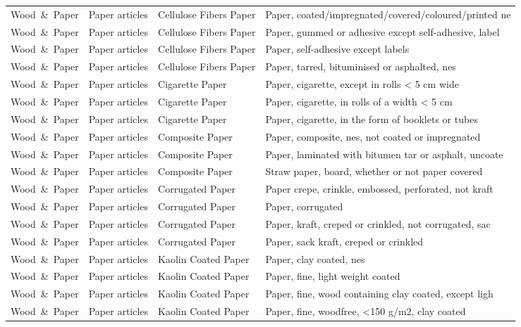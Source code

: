 \begin{appendices}
\begin{xltabular}{\textwidth}{|p{0.10\textwidth}|p{0.25\textwidth}|p{0.20\textwidth}|p{0.35\textwidth}|}
			Wood\ \&\ Paper & Paper articles & Cellulose Fibers Paper & Paper, coated/impregnated/covered/coloured/printed ne \\
			Wood\ \&\ Paper & Paper articles & Cellulose Fibers Paper & Paper, gummed or adhesive except self-adhesive, label \\
			Wood\ \&\ Paper & Paper articles & Cellulose Fibers Paper & Paper, self-adhesive except labels \\
			Wood\ \&\ Paper & Paper articles & Cellulose Fibers Paper & Paper, tarred, bituminised or asphalted, nes \\
			Wood\ \&\ Paper & Paper articles & Cigarette Paper & Paper, cigarette, except in rolls < 5 cm wide \\
			Wood\ \&\ Paper & Paper articles & Cigarette Paper & Paper, cigarette, in rolls of a width < 5 cm \\
			Wood\ \&\ Paper & Paper articles & Cigarette Paper & Paper, cigarette, in the form of booklets or tubes \\
			Wood\ \&\ Paper & Paper articles & Composite Paper & Paper, composite, nes, not coated or impregnated \\
			Wood\ \&\ Paper & Paper articles & Composite Paper & Paper, laminated with bitumen tar or asphalt, uncoate \\
			Wood\ \&\ Paper & Paper articles & Composite Paper & Straw paper, board, whether or not paper covered \\
			Wood\ \&\ Paper & Paper articles & Corrugated Paper & Paper crepe, crinkle, embossed, perforated, not kraft \\
			Wood\ \&\ Paper & Paper articles & Corrugated Paper & Paper, corrugated \\
			Wood\ \&\ Paper & Paper articles & Corrugated Paper & Paper, kraft, creped or crinkled, not corrugated, sac \\
			Wood\ \&\ Paper & Paper articles & Corrugated Paper & Paper, sack kraft, creped or crinkled \\
			Wood\ \&\ Paper & Paper articles & Kaolin Coated Paper & Paper, clay coated, nes \\
			Wood\ \&\ Paper & Paper articles & Kaolin Coated Paper & Paper, fine, light weight coated \\
			Wood\ \&\ Paper & Paper articles & Kaolin Coated Paper & Paper, fine, wood containing clay coated, except ligh \\
			Wood\ \&\ Paper & Paper articles & Kaolin Coated Paper & Paper, fine, woodfree, <150 g/m2, clay coated \\

\end{xltabular}
\end{appendices}
